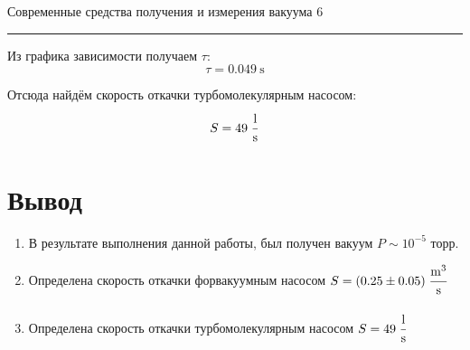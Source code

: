 \documentclass[12pt,a4paper]{scrartcl}
\begin{document}
	
	\newpage
	
	\begin{flushleft}
		\footnotesize{Современные средства получения и измерения вакуума} \hspace{\fill} \footnotesize{6}
		\\[-0.3cm]\noindent\rule{\textwidth}{0.3pt}
	\end{flushleft}
	
	Из графика зависимости получаем $\tau$:
	$$\tau = 0.049\ \text{s}$$
	
	Отсюда найдём скорость откачки турбомолекулярным насосом:
	$$ S = 49 \; \dfrac{\strut \mathrm{l} }{\strut \mathrm{s}}$$
	
	\section{Вывод}
	\begin{enumerate}
		\item В результате выполнения данной работы, был получен вакуум $P \sim 10^{-5} $ торр.
		\item Определена скорость откачки форвакуумным насосом $ S = (0.25 \pm 0.05) \; \dfrac{\strut \mathrm{m}^3 }{\strut \mathrm{s}}$
		\item Определена скорость откачки турбомолекулярным насосом $ S = 49 \; \dfrac{\strut \mathrm{l} }{\strut \mathrm{s}}$
	\end{enumerate}
\end{document}
